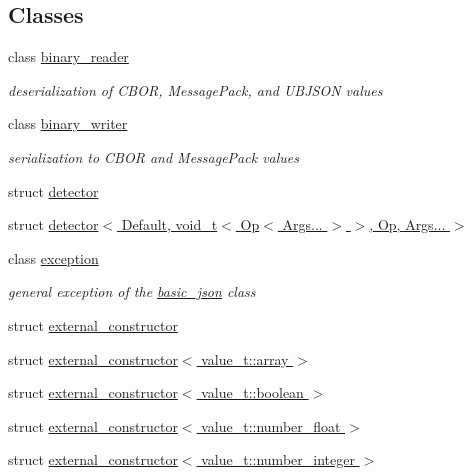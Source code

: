 \subsection*{Classes}
\begin{DoxyCompactItemize}
\item 
class \hyperlink{classnlohmann_1_1detail_1_1binary__reader}{binary\+\_\+reader}
\begin{DoxyCompactList}\small\item\em deserialization of C\+B\+OR, Message\+Pack, and U\+B\+J\+S\+ON values \end{DoxyCompactList}\item 
class \hyperlink{classnlohmann_1_1detail_1_1binary__writer}{binary\+\_\+writer}
\begin{DoxyCompactList}\small\item\em serialization to C\+B\+OR and Message\+Pack values \end{DoxyCompactList}\item 
struct \hyperlink{structnlohmann_1_1detail_1_1detector}{detector}
\item 
struct \hyperlink{structnlohmann_1_1detail_1_1detector_3_01_default_00_01void__t_3_01_op_3_01_args_8_8_8_01_4_01_4_00_01_op_00_01_args_8_8_8_01_4}{detector$<$ Default, void\+\_\+t$<$ Op$<$ Args... $>$ $>$, Op, Args... $>$}
\item 
class \hyperlink{classnlohmann_1_1detail_1_1exception}{exception}
\begin{DoxyCompactList}\small\item\em general exception of the \hyperlink{classnlohmann_1_1basic__json}{basic\+\_\+json} class \end{DoxyCompactList}\item 
struct \hyperlink{structnlohmann_1_1detail_1_1external__constructor}{external\+\_\+constructor}
\item 
struct \hyperlink{structnlohmann_1_1detail_1_1external__constructor_3_01value__t_1_1array_01_4}{external\+\_\+constructor$<$ value\+\_\+t\+::array $>$}
\item 
struct \hyperlink{structnlohmann_1_1detail_1_1external__constructor_3_01value__t_1_1boolean_01_4}{external\+\_\+constructor$<$ value\+\_\+t\+::boolean $>$}
\item 
struct \hyperlink{structnlohmann_1_1detail_1_1external__constructor_3_01value__t_1_1number__float_01_4}{external\+\_\+constructor$<$ value\+\_\+t\+::number\+\_\+float $>$}
\item 
struct \hyperlink{structnlohmann_1_1detail_1_1external__constructor_3_01value__t_1_1number__integer_01_4}{external\+\_\+constructor$<$ value\+\_\+t\+::number\+\_\+integer $>$}

\end{DoxyCompactItemize}
